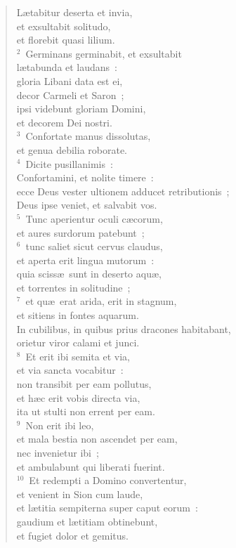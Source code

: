 \begin{flushleft}\begin{verse}\vspace{-19pt}\hspace{6pt}L\ae tabitur deserta et invia,\\\hspace{6pt} et exsultabit solitudo,\\ et florebit quasi lilium.\\
${}^{2}$~Germinans germinabit, et exsultabit\\ l\ae tabunda et laudans~:\\ gloria Libani data est ei,\\ decor Carmeli et Saron~;\\ ipsi videbunt gloriam Domini,\\ et decorem Dei nostri.\\
${}^{3}$~Confortate manus dissolutas,\\ et genua debilia roborate.\\
${}^{4}$~Dicite pusillanimis~:\\ Confortamini, et nolite timere~:\\ ecce Deus vester ultionem adducet retributionis~;\\ Deus ipse veniet, et salvabit vos.\\
${}^{5}$~Tunc aperientur oculi c\ae corum,\\ et aures surdorum patebunt~;\\
${}^{6}$~tunc saliet sicut cervus claudus,\\ et aperta erit lingua mutorum~:\\ quia sciss\ae\ sunt in deserto aqu\ae ,\\ et torrentes in solitudine~;\\
${}^{7}$~et qu\ae\ erat arida, erit in stagnum,\\ et sitiens in fontes aquarum.\\ In cubilibus, in quibus prius dracones habitabant,\\ orietur viror calami et junci.\\
${}^{8}$~Et erit ibi semita et via,\\ et via sancta vocabitur~:\\ non transibit per eam pollutus,\\ et h\ae c erit vobis directa via,\\ ita ut stulti non errent per eam.\\
${}^{9}$~Non erit ibi leo,\\ et mala bestia non ascendet per eam,\\ nec invenietur ibi~;\\ et ambulabunt qui liberati fuerint.\\
${}^{10}$~Et redempti a Domino convertentur,\\ et venient in Sion cum laude,\\ et l\ae titia sempiterna super caput eorum~:\\ gaudium et l\ae titiam obtinebunt,\\ et fugiet dolor et gemitus.\end{verse}\end{flushleft}


